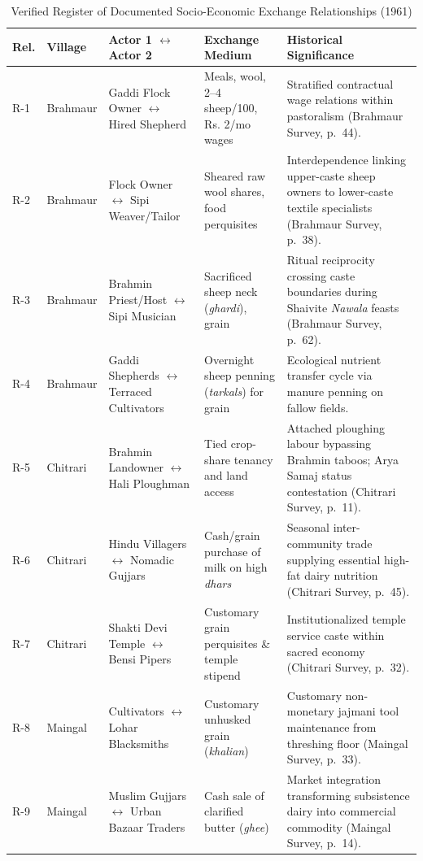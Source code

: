 \documentclass[11pt,a4paper]{article}
\begin{document}
\begin{table}[H]
\centering
\footnotesize
\caption{Verified Register of Documented Socio-Economic Exchange Relationships (1961)}
\label{tab:relationships}
\begin{tabularx}{\textwidth}{llp{3cm}p{3.5cm}X}
\toprule
\textbf{Rel.} & \textbf{Village} & \textbf{Actor 1 $\leftrightarrow$ Actor 2} & \textbf{Exchange Medium} & \textbf{Historical Significance} \\
\midrule
R-1 & Brahmaur & Gaddi Flock Owner $\leftrightarrow$ Hired Shepherd & Meals, wool, 2--4 sheep/100, Rs. 2/mo wages & Stratified contractual wage relations within pastoralism (Brahmaur Survey, p.~44). \\
R-2 & Brahmaur & Flock Owner $\leftrightarrow$ Sipi Weaver/Tailor & Sheared raw wool shares, food perquisites & Interdependence linking upper-caste sheep owners to lower-caste textile specialists (Brahmaur Survey, p.~38). \\
R-3 & Brahmaur & Brahmin Priest/Host $\leftrightarrow$ Sipi Musician & Sacrificed sheep neck (\textit{ghardi}), grain & Ritual reciprocity crossing caste boundaries during Shaivite \textit{Nawala} feasts (Brahmaur Survey, p.~62). \\
R-4 & Brahmaur & Gaddi Shepherds $\leftrightarrow$ Terraced Cultivators & Overnight sheep penning (\textit{tarkals}) for grain & Ecological nutrient transfer cycle via manure penning on fallow fields. \\
R-5 & Chitrari & Brahmin Landowner $\leftrightarrow$ Hali Ploughman & Tied crop-share tenancy and land access & Attached ploughing labour bypassing Brahmin taboos; Arya Samaj status contestation (Chitrari Survey, p.~11). \\
R-6 & Chitrari & Hindu Villagers $\leftrightarrow$ Nomadic Gujjars & Cash/grain purchase of milk on high \textit{dhars} & Seasonal inter-community trade supplying essential high-fat dairy nutrition (Chitrari Survey, p.~45). \\
R-7 & Chitrari & Shakti Devi Temple $\leftrightarrow$ Bensi Pipers & Customary grain perquisites \& temple stipend & Institutionalized temple service caste within sacred economy (Chitrari Survey, p.~32). \\
R-8 & Maingal & Cultivators $\leftrightarrow$ Lohar Blacksmiths & Customary unhusked grain (\textit{khalian}) & Customary non-monetary jajmani tool maintenance from threshing floor (Maingal Survey, p.~33). \\
R-9 & Maingal & Muslim Gujjars $\leftrightarrow$ Urban Bazaar Traders & Cash sale of clarified butter (\textit{ghee}) & Market integration transforming subsistence dairy into commercial commodity (Maingal Survey, p.~14). \\

\end{tabularx}
\end{table}
\end{document}
